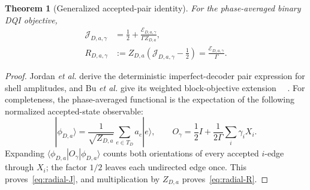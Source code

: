 \documentclass[journal]{IEEEtran}
\newtheorem{theorem}{Theorem}
\theoremstyle{definition}
\theoremstyle{remark}
\begin{document}
\begin{theorem}[Generalized accepted-pair identity]
\label{thm:section-identity}
For the phase-averaged binary DQI objective,
\begin{align}
 \mathcal J_{D,a,\gamma}
 &=\frac12+\frac{\mathcal E_{D,a,\gamma}}{\Gamma Z_{D,a}},
 \label{eq:radial-J}\\
 R_{D,a,\gamma}&:=Z_{D,a}
 \left(\mathcal J_{D,a,\gamma}-\frac12\right)
          =\frac{\mathcal E_{D,a,\gamma}}\Gamma.
 \label{eq:radial-R}
\end{align}
\end{theorem}

\begin{proof}
Jordan \emph{et al.} derive the deterministic imperfect-decoder pair
expression for shell amplitudes, and Bu \emph{et al.} give its weighted
block-objective extension~\cite[Supplementary Secs.~10.3--10.4]{jordan2025dqi}%
~\cite{bu2026}.  For completeness, the phase-averaged functional is the
expectation of the following normalized accepted-state observable:
\begin{equation}
 |\phi_{D,a}\rangle=\frac1{\sqrt{Z_{D,a}}}
    \sum_{e\in T_D}a_e|e\rangle,\qquad
 O_\gamma=\frac12I+\frac1{2\Gamma}\sum_i\gamma_iX_i.
 \label{eq:accepted-state-observable}
\end{equation}
Expanding $\langle\phi_{D,a}|O_\gamma|\phi_{D,a}\rangle$ counts both
orientations of every accepted $i$-edge through $X_i$; the factor $1/2$
leaves each undirected edge once.  This proves~\eqref{eq:radial-J}, and
multiplication by $Z_{D,a}$ proves~\eqref{eq:radial-R}.
\end{proof}
\end{document}
